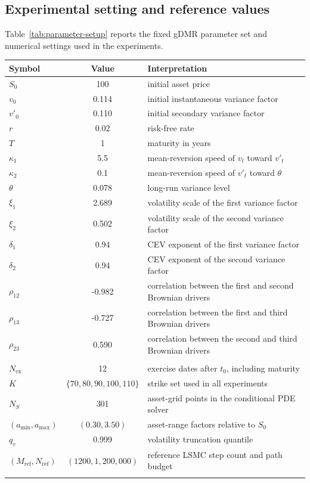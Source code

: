 \documentclass[pdflatex,sn-mathphys-num]{sn-jnl}
\makeatletter
\theoremstyle{thmstyleone}%
\theoremstyle{thmstylethree}%
\theoremstyle{thmstyletwo}%
\renewenvironment{table}[1][]{%
  \par\addvspace{12pt}%
  \noindent\begin{minipage}{\textwidth}%
  \def\@captype{table}%
  \centering%
  \tablebodyfont%
}{%
  \end{minipage}%
  \par\addvspace{12pt}%
}
\makeatother
\begin{document}
\subsection{Experimental setting and reference values}

Table~\ref{tab:parameter-setup} reports the fixed gDMR parameter set and
numerical settings used in the experiments.
\begin{table}[htbp]
\centering
\caption{Parameter set and numerical settings used in the Bermudan pricing experiments.}
\label{tab:parameter-setup}
\begin{threeparttable}
\small
\begin{tabularx}{0.94\textwidth}{@{}l c X@{}}
\toprule
Symbol & Value & Interpretation \\
\midrule
$S_0$ & 100 & initial asset price \\
$v_0$ & 0.114 & initial instantaneous variance factor \\
$v'_0$ & 0.110 & initial secondary variance factor \\
$r$ & 0.02 & risk-free rate \\
$T$ & 1 & maturity in years \\
$\kappa_1$ & 5.5 & mean-reversion speed of $v_t$ toward $v'_t$ \\
$\kappa_2$ & 0.1 & mean-reversion speed of $v'_t$ toward $\theta$ \\
$\theta$ & 0.078 & long-run variance level \\
$\xi_1$ & 2.689 & volatility scale of the first variance factor \\
$\xi_2$ & 0.502 & volatility scale of the second variance factor \\
$\delta_1$ & 0.94 & CEV exponent of the first variance factor \\
$\delta_2$ & 0.94 & CEV exponent of the second variance factor \\
$\rho_{12}$ & -0.982 & correlation between the first and second Brownian drivers \\
$\rho_{13}$ & -0.727 & correlation between the first and third Brownian drivers \\
$\rho_{23}$ & 0.590 & correlation between the second and third Brownian drivers \\
\addlinespace
\multicolumn{3}{@{}l}{\textit{Fixed numerical setting}} \\
$N_{\mathrm{ex}}$ & 12 & exercise dates after $t_0$, including maturity \\
$K$ & $\{70,80,90,100,110\}$ & strike set used in all experiments \\
$N_S$ & 301 & asset-grid points in the conditional PDE solver \\
$(a_{\min},a_{\max})$ & $(0.30,3.50)$ & asset-range factors relative to $S_0$ \\
$q_v$ & 0.999 & volatility truncation quantile \\
$(M_{\mathrm{ref}},N_{\mathrm{ref}})$ & $(1200,1{,}200{,}000)$ & reference LSMC step count and path budget \\
\botrule
\end{tabularx}
\end{threeparttable}
\end{table}
\end{document}
